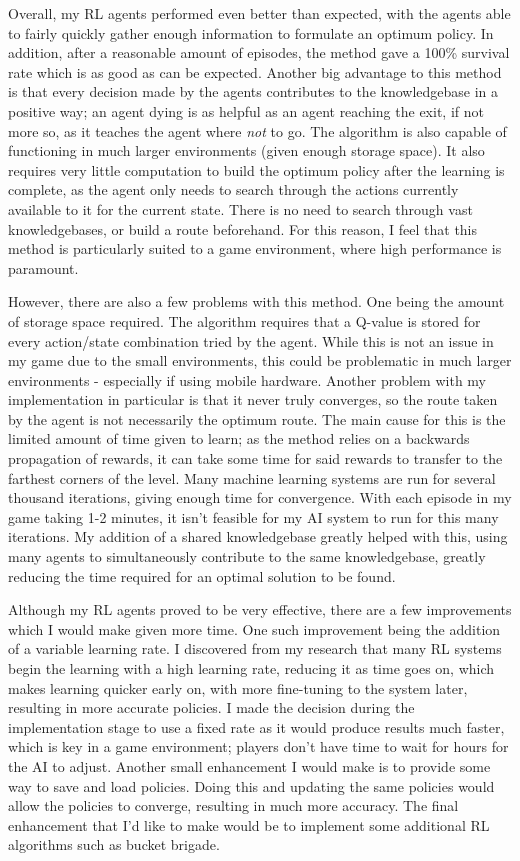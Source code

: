 \documentclass[a4paper,oneside]{report}
\begin{document}
Overall, my RL agents performed even better than expected, with the agents able to fairly quickly gather enough information to formulate an optimum policy. In addition, after a reasonable amount of episodes, the method gave a 100\% survival rate which is as good as can be expected. Another big advantage to this method is that every decision made by the agents contributes to the knowledgebase in a positive way; an agent dying is as helpful as an agent reaching the exit, if not more so, as it teaches the agent where \emph{not} to go. The algorithm is also capable of functioning in much larger environments (given enough storage space). It also requires very little computation to build the optimum policy after the learning is complete, as the agent only needs to search through the actions currently available to it for the current state. There is no need to search through vast knowledgebases, or build a route beforehand. For this reason, I feel that this method is particularly suited to a game environment, where high performance is paramount.

However, there are also a few problems with this method. One being the amount of storage space required. The algorithm requires that a Q-value is stored for every action/state combination tried by the agent. While this is not an issue in my game due to the small environments, this could be problematic in much larger environments - especially if using mobile hardware. Another problem with my implementation in particular is that it never truly converges, so the route taken by the agent is not necessarily the optimum route. The main cause for this is the limited amount of time given to learn; as the method relies on a backwards propagation of rewards, it can take some time for said rewards to transfer to the farthest corners of the level. Many machine learning systems are run for several thousand iterations, giving enough time for convergence. With each episode in my game taking 1-2 minutes, it isn't feasible for my AI system to run for this many iterations. My addition of a shared knowledgebase greatly helped with this, using many agents to simultaneously contribute to the same knowledgebase, greatly reducing the time required for an optimal solution to be found. 

Although my RL agents proved to be very effective, there are a few improvements which I would make given more time. One such improvement being the addition of a variable learning rate. I discovered from my research that many RL systems begin the learning with a high learning rate, reducing it as time goes on, which makes learning quicker early on, with more fine-tuning to the system later, resulting in more accurate policies. I made the decision during the implementation stage to use a fixed rate as it would produce results much faster, which is key in a game environment; players don't have time to wait for hours for the AI to adjust. Another small enhancement I would make is to provide some way to save and load policies. Doing this and updating the same policies would allow the policies to converge, resulting in much more accuracy. The final enhancement that I'd like to make would be to implement some additional RL algorithms such as bucket brigade.
\end{document}
